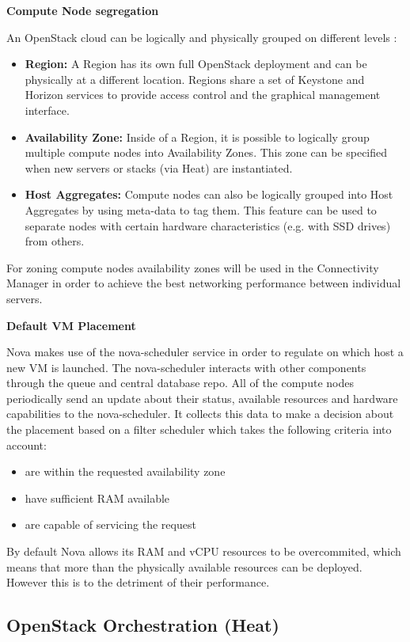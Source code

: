 \textbf{Compute Node segregation}

An OpenStack cloud can be logically and physically grouped on different levels \cite{openstack-ops}:
\begin{itemize}
\item \textbf{Region:} A Region has its own full OpenStack deployment and can be physically at a different location. Regions share a set of Keystone and Horizon services to provide access control and the graphical management interface.
\item \textbf{Availability Zone:} Inside of a Region, it is possible to logically group multiple compute nodes into Availability Zones. This zone can be specified when new servers or stacks (via Heat) are instantiated.
\item \textbf{Host Aggregates:} Compute nodes can also be logically grouped into Host Aggregates by using meta-data to tag them. This feature can be used to separate nodes with certain hardware characteristics (e.g. with SSD drives) from others.
\end{itemize}

For zoning compute nodes availability zones will be used in the Connectivity Manager in order to achieve the best networking performance between individual servers.

\newpage
\textbf{Default VM Placement}

Nova makes use of the nova-scheduler service in order to regulate on which host a new VM is launched. The nova-scheduler interacts with other components through the queue and central database repo. All of the compute nodes periodically send an update about their status,  available resources and hardware capabilities to the nova-scheduler. It collects this data to make a decision about the placement based on a filter scheduler which takes the following criteria into account:
\begin{itemize}
\item are within the requested availability zone
\item have sufficient RAM available
\item are capable of servicing the request
\end{itemize}
By default Nova allows its RAM and vCPU resources to be overcommited, which means that more than the physically available resources can be deployed. However this is to the detriment of their performance.

\subsection{OpenStack Orchestration (Heat)}


